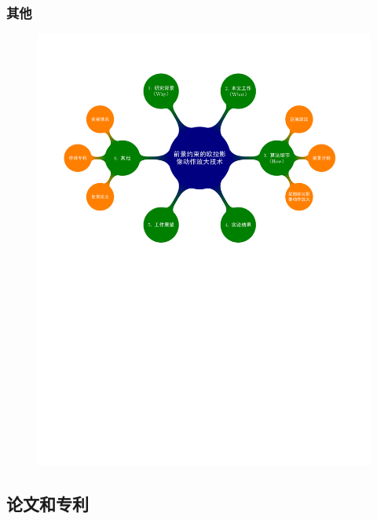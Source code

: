 \documentclass[xcolor=svgnames,serif,table]{beamer}
\begin{document}
\begin{frame}
  \frametitle{其他}
  \vspace{-2.5em}
  \begin{figure}
    \centering
    \includegraphics[width=\textwidth, page=10]{mindmap.pdf}
  \end{figure}
\end{frame}

\subsection{论文和专利}
\end{document}
